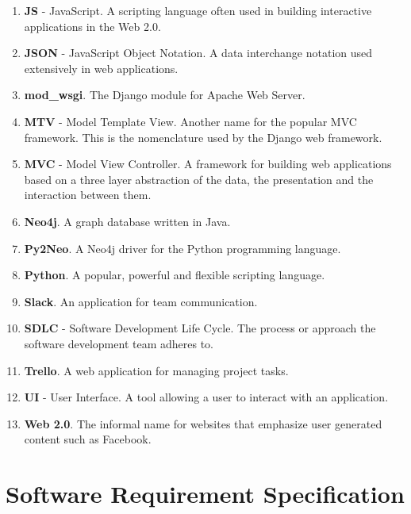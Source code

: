 \documentclass[12pt,onecolumn]{article}
\begin{document}
\begin{enumerate}
		\item \textbf{JS} - JavaScript. A scripting language often used in building interactive applications in the Web 2.0.
		
		\item \textbf{JSON} - JavaScript Object Notation. A data interchange notation used extensively in web applications.
		
		\item \textbf{mod\_wsgi}. The Django module for Apache Web Server.
		
		\item \textbf{MTV} - Model Template View. Another name for the popular MVC framework. This is the nomenclature used by the Django web framework.
		
		\item \textbf{MVC} - Model View Controller. A framework for building web applications based on a three layer abstraction of the data, the presentation and the interaction between them. 
		
		\item \textbf{Neo4j}. A graph database written in Java.
		
		\item \textbf{Py2Neo}. A Neo4j driver for the Python programming language.
		
		\item \textbf{Python}. A popular, powerful and flexible scripting language.
		
		\item \textbf{Slack}. An application for team communication.
		
		\item \textbf{SDLC} - Software Development Life Cycle. The process or approach the software development team adheres to.
		
		\item \textbf{Trello}. A web application for managing project tasks.
		
		\item \textbf{UI} - User Interface. A tool allowing a user to interact with an application.
		
		\item \textbf{Web 2.0}. The informal name for websites that emphasize user generated content such as Facebook.
		
		
	\end{enumerate}
	
	\section{Software Requirement Specification} %
	
\end{document}
